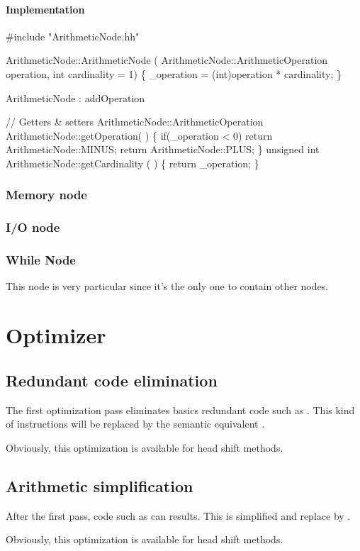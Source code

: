 \paragraph{Implementation}
\nwenddocs{}\endmoddef\nwstartdeflinemarkup\nwenddeflinemarkup
#include "ArithmeticNode.hh"

ArithmeticNode::ArithmeticNode ( ArithmeticNode::ArithmeticOperation operation, int cardinality = 1) \{
        _operation = (int)operation * cardinality;
\}

\LA{}ArithmeticNode : addOperation\RA{}

// Getters & setters
ArithmeticNode::ArithmeticOperation ArithmeticNode::getOperation( ) \{
        if(_operation < 0) return ArithmeticNode::MINUS;
        return ArithmeticNode::PLUS;
\}
unsigned int ArithmeticNode::getCardinality ( ) \{ return _operation; \}
\nwendcode{}\nwdocspar

\subsubsection{Memory node}

\subsubsection{I/O node}

\subsubsection{While Node}
This node is very particular since it's the only one to contain other nodes. 
\nwenddocs{}\section{Optimizer}

\subsection{Redundant code elimination\label{RCE}}
The first optimization pass eliminates basics redundant code such as \ttt{+++++}. This kind of instructions will be replaced by the semantic equivalent .

Obviously, this optimization is available for head shift methods.

\subsection{Arithmetic simplification\label{AS}}
After the first pass, code such as  can results. This is simplified and replace by \ttt{-}.

Obviously, this optimization is available for head shift methods.
\nwenddocs{}
